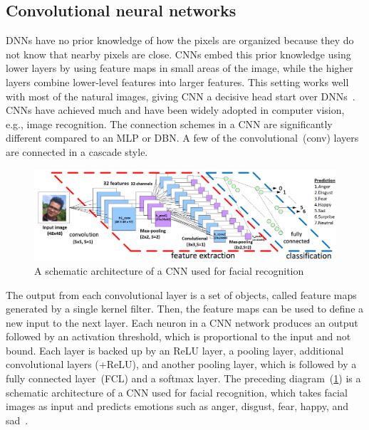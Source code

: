 \subsection{Convolutional neural networks}
DNNs have no prior knowledge of how the pixels are organized because they do not know that nearby pixels are close. CNNs embed this prior knowledge using lower layers by using feature maps in small areas of the image, while the higher layers combine lower-level features into larger features. This setting works well with most of the natural images, giving CNN a decisive head start over DNNs~\cite{karimIoT2019}. CNNs have achieved much and have been widely adopted in computer vision, e.g., image recognition. The connection schemes in a CNN are significantly different compared to an MLP or DBN. A few of the convolutional~(conv) layers are connected in a cascade style. 

\begin{figure}[h]
    \centering
    \includegraphics[scale=0.6]{images/cnn.png}
    \caption{A schematic architecture of a CNN used for facial recognition~\cite{karim2017predictive,zaccone2018deep}}
    \label{fig:cnn_theory1}
\end{figure}

\hspace*{3.5mm} The output from each convolutional layer is a set of objects, called feature maps generated by a single kernel filter. Then, the feature maps can be used to define a new input to the next layer. Each neuron in a CNN network produces an output followed by an activation threshold, which is proportional to the input and not bound. Each layer is backed up by an ReLU layer, a pooling layer, additional convolutional layers (+ReLU), and another pooling layer, which is followed by a fully connected layer~(FCL) and a softmax layer. The preceding diagram~(\cref{fig:cnn_theory1}) is a schematic architecture of a CNN used for facial recognition, which takes facial images as input and predicts emotions such as anger, disgust, fear, happy, and sad~\cite{karimDLTF2018}.  

